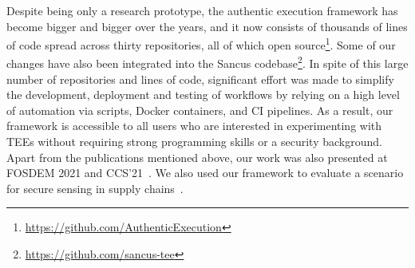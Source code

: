 Despite being only a research prototype, the authentic execution framework has
become bigger and bigger over the years, and it now consists of thousands of
lines of code spread across thirty repositories, all of which open
source\footnote{\url{https://github.com/AuthenticExecution}}. Some of our
changes have also been integrated into the Sancus
codebase\footnote{\url{https://github.com/sancus-tee}}. In spite of this large
number of repositories and lines of code, significant effort was made to
simplify the development, deployment and testing of workflows by relying on a
high level of automation via scripts, Docker containers, and \ac{CI} pipelines.
As a result, our framework is accessible to all users who are interested in
experimenting with \acsp{TEE} without requiring strong programming skills or a
security background. Apart from the publications mentioned above, our work was
also presented at FOSDEM 2021 and
CCS'21~\cite{authExecFosdem,scopelliti2021poster}. We also used our framework to
evaluate a scenario for secure sensing in supply
chains~\cite{pennekamp2024securing}.